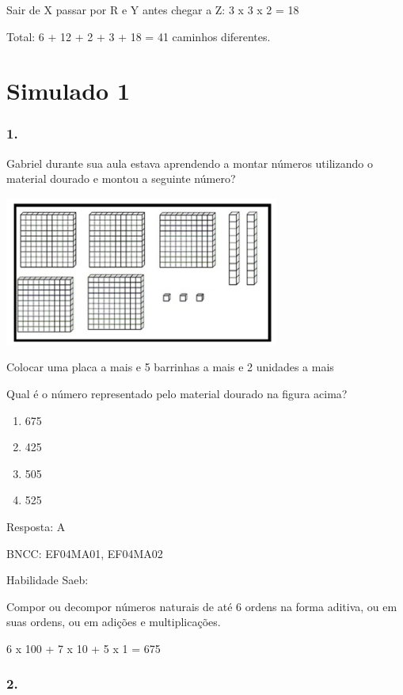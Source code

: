 Sair de X passar por R e Y antes chegar a Z: 3 x 3 x 2 = 18

Total: 6 + 12 + 2 + 3 + 18 = 41 caminhos diferentes.

\section{Simulado 1}\label{simulado-1}

\subsubsection{1.}\label{section-143}

Gabriel durante sua aula estava aprendendo a montar números utilizando o
material dourado e montou a seguinte número?

\includegraphics[width=3.55128in,height=1.93600in]{media/image142.png}

Colocar uma placa a mais e 5 barrinhas a mais e 2 unidades a mais

Qual é o número representado pelo material dourado na figura acima?

\begin{enumerate}
\def\labelenumi{\alph{enumi})}
\item
  675
\item
  425
\item
  505
\item
  525
\end{enumerate}

Resposta: A

BNCC: EF04MA01, EF04MA02

Habilidade Saeb:

Compor ou decompor números naturais de até 6 ordens na forma aditiva, ou
em suas ordens, ou em adições e multiplicações.

6 x 100 + 7 x 10 + 5 x 1 = 675

\subsubsection{2.}\label{section-144}

